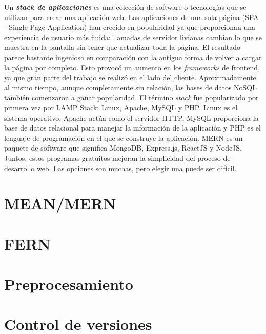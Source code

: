 Un \textbf{\textit{stack de aplicaciones}} es una colección de software o tecnologías que se utilizan para crear una aplicación web. Las aplicaciones de una sola página (SPA - Single Page Application) han crecido en popularidad ya que proporcionan una experiencia de usuario más fluida: llamadas de servidor livianas cambian lo que se muestra en la pantalla sin tener que actualizar toda la página. El resultado parece bastante ingenioso en comparación con la antigua forma de volver a cargar la página por completo. Esto provocó un aumento en los \textit{frameworks} de \gls{frontend}, ya que gran parte del trabajo se realizó en el lado del cliente. Aproximadamente al mismo tiempo, aunque completamente sin relación, las bases de datos NoSQL también comenzaron a ganar popularidad. El término \textit{stack} fue popularizado por primera vez por LAMP Stack: Linux, Apache, MySQL y PHP. Linux es el sistema operativo, Apache actúa como el servidor HTTP, MySQL proporciona la base de datos relacional para manejar la información de la aplicación y PHP es el lenguaje de programación en el que se construye la aplicación. MERN es un paquete de software que significa MongoDB, Express.js, ReactJS y NodeJS. Juntos, estos programas gratuitos mejoran la simplicidad del proceso de desarrollo web. Las opciones son muchas, pero elegir una puede ser difícil.

% 

\section{MEAN/MERN}


\newpage
\section{FERN}


\newpage
\section{Preprocesamiento}


\newpage
\section{Control de versiones}
